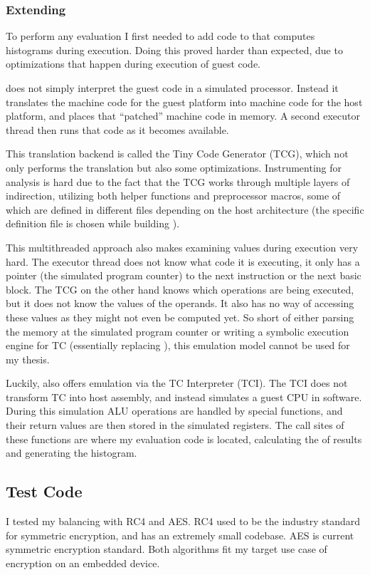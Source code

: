 \subsubsection{Extending \qemu{}}
To perform any evaluation I first needed to add code to \qemu{} that computes \hammingw{} histograms during execution.
Doing this proved harder than expected, due to optimizations that happen during execution of guest code.

\qemu{} does not simply interpret the guest code in a simulated processor.
Instead it translates the machine code for the guest platform into machine code for the host platform, and places that ``patched'' machine code in memory.
A second executor thread then runs that code as it becomes available.

This translation backend is called the Tiny Code Generator (TCG), which not only performs the translation but also some optimizations.
Instrumenting \qemu{} for analysis is hard due to the fact that the TCG works through multiple layers of indirection, utilizing both helper functions and preprocessor macros, some of which are defined in different files depending on the host architecture (the specific definition file is chosen while building \qemu{}).

This multithreaded approach also makes examining values during execution very hard.
The executor thread does not know what code it is executing, it only has a pointer (the simulated program counter) to the next instruction or the next basic block.
The TCG on the other hand knows which operations are being executed, but it does not know the values of the operands.
It also has no way of accessing these values as they might not even be computed yet.
So short of either parsing the memory at the simulated program counter or writing a symbolic execution engine for TC (essentially replacing \qemu{}), this emulation model cannot be used for my thesis.

Luckily, \qemu{} also offers emulation via the TC Interpreter (TCI).
The TCI does not transform TC into host assembly, and instead simulates a guest CPU in software.
During this simulation ALU operations are handled by special functions, and their return values are then stored in the simulated registers.
The call sites of these functions are where my evaluation code is located, calculating the \hammingw{} of results and generating the histogram.

\subsection{Test Code}
I tested my balancing with RC4\cite{rc4} and AES\cite{daemen2013design}.
RC4 used to be the industry standard for symmetric encryption, and has an extremely small codebase.
AES is current symmetric encryption standard.
Both algorithms fit my target use case of encryption on an embedded device.

